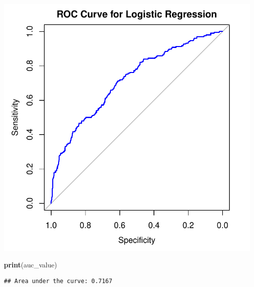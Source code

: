 \documentclass[
]{article}
\newenvironment{Shaded}{\begin{snugshade}}{\end{snugshade}}
\newcommand{\FunctionTok}[1]{\textcolor[rgb]{0.13,0.29,0.53}{\textbf{#1}}}
\newcommand{\NormalTok}[1]{#1}
\begin{document}
\includegraphics{3_logistic_regression_files/figure-latex/model_fit_a-1.pdf}

\begin{Shaded}
\begin{Highlighting}[]
\FunctionTok{print}\NormalTok{(auc\_value)}
\end{Highlighting}
\end{Shaded}

\begin{verbatim}
## Area under the curve: 0.7167
\end{verbatim}
\end{document}
